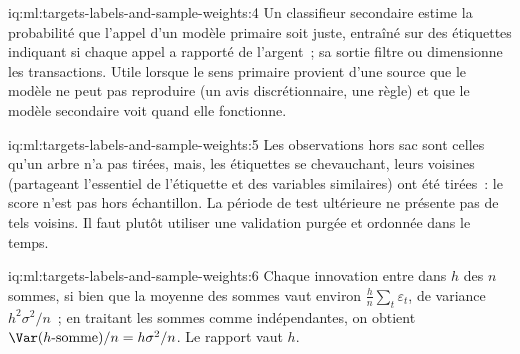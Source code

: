 \begin{solution}{iq:ml:targets-labels-and-sample-weights:4}
Un classifieur secondaire estime la probabilité que l'appel d'un modèle primaire soit juste, entraîné sur des étiquettes indiquant si chaque appel
a rapporté de l'argent~; sa sortie filtre ou dimensionne les transactions. Utile lorsque le sens primaire provient d'une source que le
modèle ne peut pas reproduire (un avis discrétionnaire, une règle) et que le modèle secondaire voit quand elle fonctionne.
\end{solution}

\begin{solution}{iq:ml:targets-labels-and-sample-weights:5}
Les observations hors sac sont celles qu'un arbre n'a pas tirées, mais, les étiquettes se chevauchant, leurs voisines (partageant l'essentiel
de l'étiquette et des variables similaires) ont été tirées~: le score n'est pas hors échantillon. La période de test ultérieure ne présente pas
de tels voisins. Il faut plutôt utiliser une validation purgée et ordonnée dans le temps.
\end{solution}

\begin{solution}{iq:ml:targets-labels-and-sample-weights:6}
Chaque innovation entre dans $h$ des $n$ sommes, si bien que la moyenne des sommes vaut environ $\frac hn\sum_t\varepsilon_t$, de variance
$h^2\sigma^2/n$~; en traitant les sommes comme indépendantes, on obtient $\Var(h\text{-somme})/n = h\sigma^2/n$. Le rapport vaut $h$.
\end{solution}
